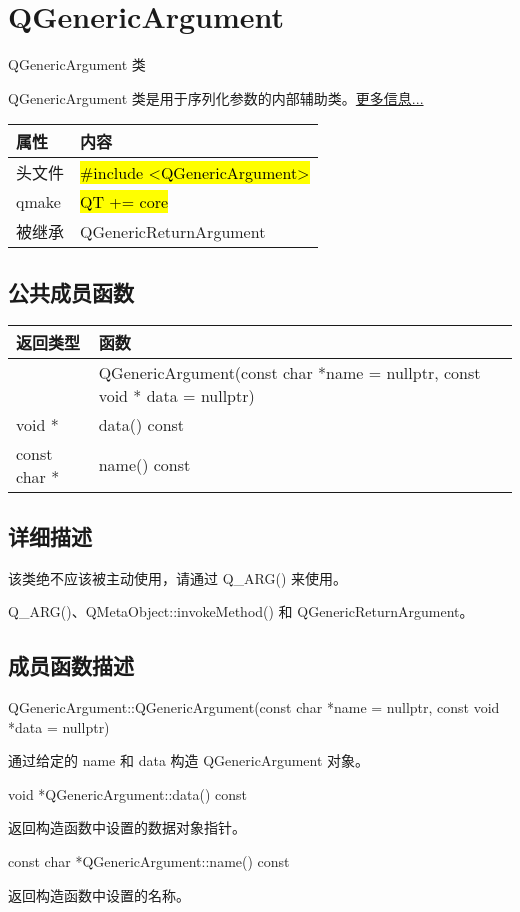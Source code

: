 \chapter{QGenericArgument }

QGenericArgument 类

QGenericArgument 类是用于序列化参数的内部辅助类。\href{https://github.com/JackLovel/QtDocumentCN/blob/master/Src/G/QGenericArgument/QGenericArgument.md#%E8%AF%A6%E7%BB%86%E6%8F%8F%E8%BF%B0}{更多信息...}

\begin{tabular}{|l|l|}
\hline
属性& 	内容\\
\hline
头文件& 	\hl{\#include <QGenericArgument>}\\
\hline
qmake& 	\hl{QT += core}\\
\hline
被继承& 	QGenericReturnArgument\\
\hline
\end{tabular}


\splitLine

\section{公共成员函数}


\begin{tabular}{|l|m{30em}|}
\hline
返回类型& 	函数\\
\hline
	&QGenericArgument(const char *name = nullptr, const void * data =
   nullptr)\\
\hline
void * 	&data() const\\
\hline
const char *& 	name() const\\
\hline
\end{tabular}

\splitLine

\section{详细描述}

该类绝不应该被主动使用，请通过 Q\_ARG() 来使用。



\begin{seeAlso}
Q\_ARG()、QMetaObject::invokeMethod() 和 QGenericReturnArgument。
\end{seeAlso}

\splitLine

\section{成员函数描述}

QGenericArgument::QGenericArgument(const char *name = nullptr, const void *data = nullptr)

通过给定的 name 和 data 构造 QGenericArgument 对象。

void *QGenericArgument::data() const

返回构造函数中设置的数据对象指针。

const char *QGenericArgument::name() const

返回构造函数中设置的名称。

